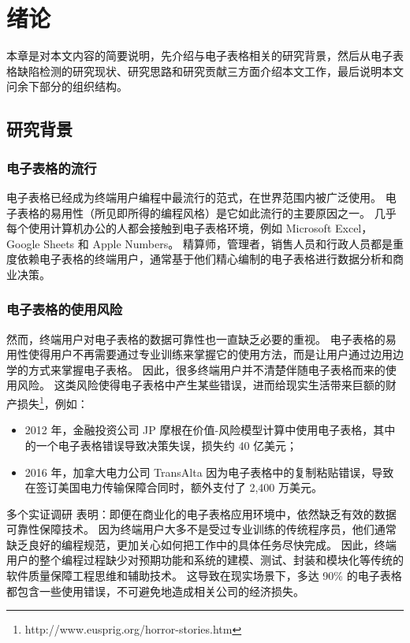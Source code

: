 \chapter{绪论}\label{introduction}

本章是对本文内容的简要说明，先介绍与电子表格相关的研究背景，然后从电子表格缺陷检测的研究现状、研究思路和研究贡献三方面介绍本文工作，最后说明本文问余下部分的组织结构。

\section{研究背景}

\subsection{电子表格的流行}

电子表格已经成为终端用户编程中最流行的范式，在世界范围内被广泛使用。
电子表格的易用性（所见即所得的编程风格）是它如此流行的主要原因之一。
几乎每个使用计算机办公的人都会接触到电子表格环境，例如 Microsoft Excel，Google Sheets 和 Apple Numbers。
精算师，管理者，销售人员和行政人员都是重度依赖电子表格的终端用户\cite{scaffidi2005estimating}，通常基于他们精心编制的电子表格进行数据分析和商业决策。


\subsection{电子表格的使用风险}

然而，终端用户对电子表格的数据可靠性也一直缺乏必要的重视。
电子表格的易用性使得用户不再需要通过专业训练来掌握它的使用方法，而是让用户通过边用边学的方式来掌握电子表格。
因此，很多终端用户并不清楚伴随电子表格而来的使用风险。
这类风险使得电子表格中产生某些错误，进而给现实生活带来巨额的财产损失\footnote{http://www.eusprig.org/horror-stories.htm}，例如：

\begin{itemize}
    \item 2012 年，金融投资公司 JP 摩根在价值-风险模型计算中使用电子表格，其中的一个电子表格错误导致决策失误，损失约 40 亿美元；
    \item 2016 年，加拿大电力公司 TransAlta 因为电子表格中的复制粘贴错误，导致在签订美国电力传输保障合同时，额外支付了 2,400 万美元。
\end{itemize}

多个实证调研 \cite{panko2016we,powell2009impact} 表明：即便在商业化的电子表格应用环境中，依然缺乏有效的数据可靠性保障技术。
因为终端用户大多不是受过专业训练的传统程序员，他们通常缺乏良好的编程规范，更加关心如何把工作中的具体任务尽快完成。
因此，终端用户的整个编程过程缺少对预期功能和系统的建模、测试、封装和模块化等传统的软件质量保障工程思维和辅助技术。
这导致在现实场景下，多达 90\% 的电子表格都包含一些使用错误\cite{rajalingham2008classification}，不可避免地造成相关公司的经济损失。


